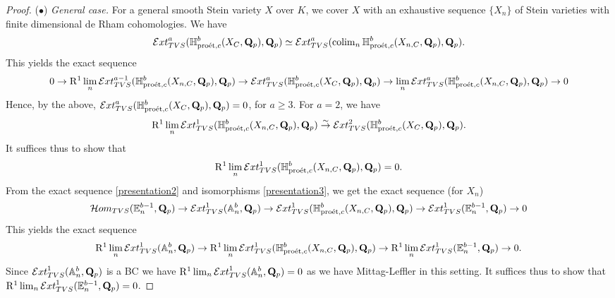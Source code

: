 \documentclass[10pt,reqno]{amsart}
\let\cal\mathcal
\theoremstyle{definition}
\theoremstyle{remark}
\newcommand{\colim}{\operatorname{colim} }
\newcommand{\proeet}{\operatorname{pro\acute{e}t} }
\newcommand{\Hhom}{{\cal Hom}}
\numberwithin{equation}{section}
\def\R{{\mathrm R}}
\def\Q{{\bf Q}} \def\Z{{\bf Z}}
\numberwithin{equation}{section}
\begin{document}
\begin{proof}
   \vskip2mm
   ($\bullet$) {\em General case.}   For  a general smooth Stein variety $X$ over $K$, we cover $X$ with an exhaustive sequence $\{X_n\}$ of Stein varieties with finite dimensional de Rham cohomologies. We have
    \begin{align*}
{\mathcal Ext}^a_{\rm TVS}(\mathbb{H}^{b}_{\proeet,c}(X_C,\Q_p),\Q_p)\simeq {\mathcal Ext}^a_{\rm TVS}(\colim_n\mathbb{H}^{b}_{\proeet,c}(X_{n,C},\Q_p),\Q_p).
\end{align*}
This yields the exact sequence
$$
0\to  \R^1\lim_n{\mathcal Ext}^{a-1}_{\rm TVS}(\mathbb{H}^{b}_{\proeet,c}(X_{n,C},\Q_p),\Q_p)\to {\mathcal Ext}^a_{\rm TVS}(\mathbb{H}^{b}_{\proeet,c}(X_C,\Q_p),\Q_p)\to \lim_n{\mathcal Ext}^a_{\rm TVS}(\mathbb{H}^{b}_{\proeet,c}(X_{n,C},\Q_p),\Q_p)\to 0
$$
Hence, by the above, $ {\mathcal Ext}^a_{\rm TVS}(\mathbb{H}^{b}_{\proeet,c}(X_C,\Q_p),\Q_p)=0$, for $a\geq 3$. For $a=2$, we have
$$
\R^1\lim_n{\mathcal Ext}^{1}_{\rm TVS}(\mathbb{H}^{b}_{\proeet,c}(X_{n,C},\Q_p),\Q_p)\stackrel{\sim}{\to} {\mathcal Ext}^2_{\rm TVS}(\mathbb{H}^{b}_{\proeet,c}(X_C,\Q_p),\Q_p).
$$
It suffices thus to show that
$$
\R^1\lim_n{\mathcal Ext}^{1}_{\rm TVS}(\mathbb{H}^{b}_{\proeet,c}(X_{n,C},\Q_p),\Q_p)=0. 
$$
From the exact sequence \eqref{presentation2} and isomorphisms \eqref{presentation3}, we get
the exact sequence (for $X_n$)
$$
\Hhom_{\rm TVS}(\mathbb{E}^{b-1}_n,\Q_p) \to { \mathcal Ext}^1_{\rm TVS}(\mathbb{A}^b_n,\Q_p)\to {\mathcal Ext}^1_{\rm TVS}(\mathbb{H}^{b}_{\proeet,c}(X_{n,C},\Q_p),\Q_p)\to {\mathcal Ext}^1_{\rm TVS}(\mathbb{E}^{b-1}_n,\Q_p)\to 0
$$
This yields the exact sequence 
$$
\R^1\lim_n{\mathcal Ext}^{1}_{\rm TVS}({\mathbb{A}}^b_n,\Q_p)\to \R^1\lim_n{\mathcal Ext}^{1}_{\rm TVS}(\mathbb{H}^{b}_{\proeet,c}(X_{n,C},\Q_p),\Q_p)\to \R^1\lim_n {\mathcal Ext}^1_{\rm TVS}(\mathbb{E}^{b-1}_n,\Q_p)\to 0.
$$
Since ${\mathcal Ext}^{1}_{\rm TVS}({\mathbb{A}}^b_n,\Q_p)$ is a BC we have $\R^1\lim_n{\mathcal Ext}^{1}_{\rm TVS}({\mathbb{A}}^b_n,\Q_p)=0$ as  we have Mittag-Leffler in this setting. It suffices thus to show that  
$\R^1\lim_n {\mathcal Ext}^1_{\rm TVS}(\mathbb{E}^{b-1}_n,\Q_p)=0$.


\end{proof}
\end{document}
